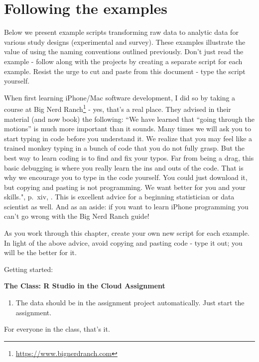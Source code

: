 \documentclass[
]{krantz}
\providecommand{\tightlist}{%
  \setlength{\itemsep}{0pt}\setlength{\parskip}{0pt}}
\renewcommand{\href}[2]{#2\footnote{\url{#1}}}
\begin{document}
\hypertarget{following-the-examples}{%
\section{Following the examples}\label{following-the-examples}}

Below we present example scripts transforming raw data to analytic data for various study designs (experimental and survey). These examples illustrate the value of using the naming conventions outlined previously. Don't just read the example - follow along with the projects by creating a separate script for each example. Resist the urge to cut and paste from this document - type the script yourself.

When first learning iPhone/Mac software development, I did so by taking a course at \href{https://www.bignerdranch.com}{Big Nerd Ranch} - yes, that's a real place. They advised in their material (and now book) the following: ``We have learned that ``going through the motions'' is much more important than it sounds. Many times we will ask you to start typing in code before you understand it. We realize that you may feel like a trained monkey typing in a bunch of code that you do not fully grasp. But the best way to learn coding is to find and fix your typos. Far from being a drag, this basic debugging is where you really learn the ins and outs of the code. That is why we encourage you to type in the code yourself. You could just download it, but copying and pasting is not programming. We want better for you and your skills.", p.~xiv, \citep{keur2020}. This is excellent advice for a beginning statistician or data scientist as well. And as an aside: if you want to learn iPhone programming you can't go wrong with the Big Nerd Ranch guide!

As you work through this chapter, create your own new script for each example. In light of the above advice, avoid copying and pasting code - type it out; you will be the better for it.

Getting started:

\textbf{The Class: R Studio in the Cloud Assignment}

\begin{enumerate}
\def\labelenumi{\arabic{enumi}.}
\tightlist
\item
  The data should be in the assignment project automatically. Just start the assignment.
\end{enumerate}

For everyone in the class, that's it.
\end{document}
